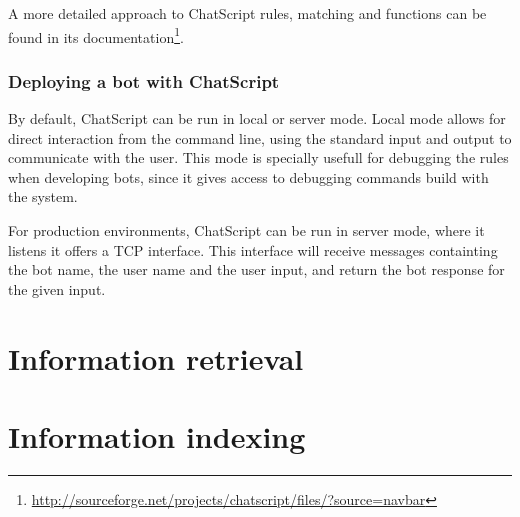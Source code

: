 A more detailed approach to ChatScript rules, matching and functions can be found in its documentation\footnote{\url{http://sourceforge.net/projects/chatscript/files/?source=navbar}}.

\subsubsection{Deploying a bot with ChatScript}

By default, ChatScript can be run in local or server mode. Local mode allows for direct interaction from the command line, using the standard input and output to communicate with the user. This mode is specially usefull for debugging the rules when developing bots, since it gives access to debugging commands build with the system.

For production environments, ChatScript can be run in server mode, where it listens it offers a TCP interface. This interface will receive messages containting the bot name, the user name and the user input, and return the bot response for the given input.

\section{Information retrieval}


\section{Information indexing}

